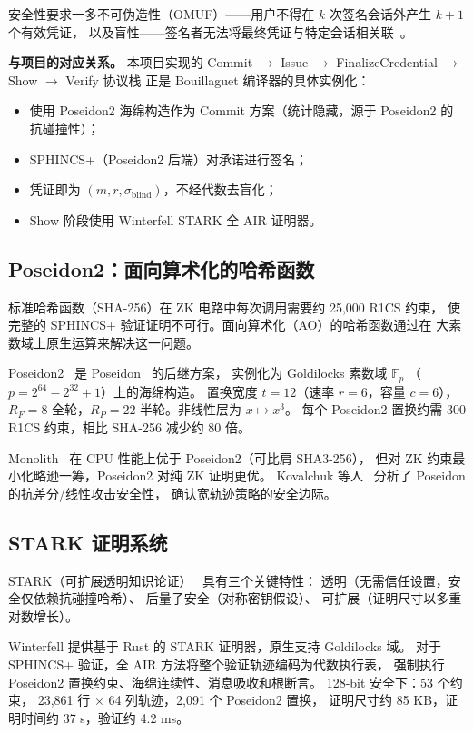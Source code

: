 \documentclass[11pt,a4paper]{ctexart}
\begin{document}
安全性要求一多不可伪造性（OMUF）——用户不得在 $k$ 次签名会话外产生 $k+1$ 个有效凭证，
以及盲性——签名者无法将最终凭证与特定会话相关联~\cite{Bouillaguet2026BlindingPH}。

\textbf{与项目的对应关系。}
本项目实现的 Commit $\to$ Issue $\to$ FinalizeCredential $\to$ Show $\to$ Verify 协议栈
正是 Bouillaguet 编译器的具体实例化：
\begin{itemize}
\item 使用 Poseidon2 海绵构造作为 Commit 方案（统计隐藏，源于 Poseidon2 的抗碰撞性）；
\item SPHINCS+（Poseidon2 后端）对承诺进行签名；
\item 凭证即为 $(m, r, \sigma_{\mathrm{blind}})$，不经代数去盲化；
\item Show 阶段使用 Winterfell STARK 全 AIR 证明器。
\end{itemize}

\subsection{Poseidon2：面向算术化的哈希函数}

标准哈希函数（SHA-256）在 ZK 电路中每次调用需要约 25,000 R1CS 约束，
使完整的 SPHINCS+ 验证证明不可行。面向算术化（AO）的哈希函数通过在
大素数域上原生运算来解决这一问题。

Poseidon2~\cite{Grassi2023Poseidon2} 是 Poseidon~\cite{Grassi2019Poseidon} 的后继方案，
实例化为 Goldilocks 素数域 $\mathbb{F}_p$
（$p = 2^{64} - 2^{32} + 1$）上的海绵构造。
置换宽度 $t = 12$（速率 $r = 6$，容量 $c = 6$），
$R_F = 8$ 全轮，$R_P = 22$ 半轮。非线性层为 $x \mapsto x^3$。
每个 Poseidon2 置换约需 300 R1CS 约束，相比 SHA-256 减少约 80 倍。

Monolith~\cite{Grassi2024Monolith} 在 CPU 性能上优于 Poseidon2（可比肩 SHA3-256），
但对 ZK 约束最小化略逊一筹，Poseidon2 对纯 ZK 证明更优。
Kovalchuk 等人~\cite{2021Security} 分析了 Poseidon 的抗差分/线性攻击安全性，
确认宽轨迹策略的安全边际。

\subsection{STARK 证明系统}

STARK（可扩展透明知识论证）~\cite{2019DEEP} 具有三个关键特性：
透明（无需信任设置，安全仅依赖抗碰撞哈希）、
后量子安全（对称密钥假设）、
可扩展（证明尺寸以多重对数增长）。

Winterfell 提供基于 Rust 的 STARK 证明器，原生支持 Goldilocks 域。
对于 SPHINCS+ 验证，全 AIR 方法将整个验证轨迹编码为代数执行表，
强制执行 Poseidon2 置换约束、海绵连续性、消息吸收和根断言。
128-bit 安全下：53 个约束，
23,861 行 $\times$ 64 列轨迹，2,091 个 Poseidon2 置换，
证明尺寸约 85 KB，证明时间约 37 s，验证约 4.2 ms。
\end{document}
